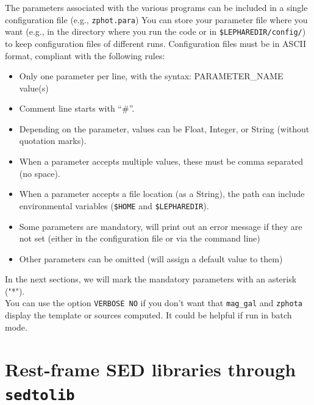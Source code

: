 \documentclass[12pt]{article}
\begin{document}
 The parameters associated with the various programs can be included in a single configuration file (e.g., \texttt{zphot.para}) 
 You can store your parameter file where you want (e.g., in the directory where you run the code or in \texttt{\$LEPHAREDIR/config/}) to keep configuration files of different runs.  
Configuration files must be in ASCII format, compliant with the following rules: 
%
\begin{itemize}
\item Only one parameter per line, 
with the syntax: PARAMETER\_NAME  value(s)
\item Comment line starts with ``\#''.
\item Depending on the parameter, values can be  Float, Integer, or String (without quotation marks). 
\item When a parameter accepts multiple values, these must be comma separated (no space).
\item When a parameter accepts a file location (as a String), the path can include environmental variables (\texttt{\$HOME} and \texttt{\$LEPHAREDIR}). 
\item Some parameters are mandatory, \lp will print out an error message if they are not set (either in the configuration file or via the command line)
\item Other parameters can be omitted (\lp will assign a default value to them)
\end{itemize}
%
In the next sections, we will mark the mandatory parameters with an asterisk  ("*"). \\

You can use the option \texttt{VERBOSE NO} if you don't want that \texttt{mag\_gal} and \texttt{zphota} display the template or sources computed. It could be helpful if run in batch mode. 

 
 \newpage
 
 


\section{Rest-frame SED libraries through  \texttt{sedtolib}}\label{models}
%
%
\end{document}
